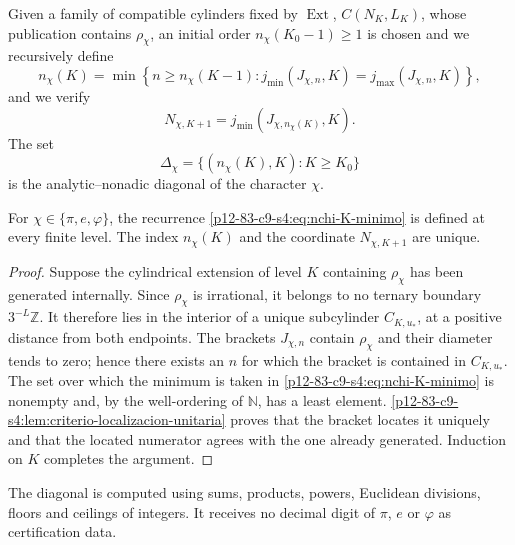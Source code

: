 \begin{definition}
\label{p12-83-c9-s4:def:recurrencia-diagonal-constantes}
Given a family of compatible cylinders fixed by \(\operatorname{Ext}\),
\(C(N_K,L_K)\), whose publication contains \(\rho_\chi\), an initial order
\(n_\chi(K_0-1)\geq1\) is chosen and we recursively define
\begin{equation}
 n_\chi(K)=
 \min\left\{
 n\geq n_\chi(K-1):
 j_{\min}(J_{\chi,n},K)=j_{\max}(J_{\chi,n},K)
 \right\},
 \label{p12-83-c9-s4:eq:nchi-K-minimo}
\end{equation}
and we verify
\begin{equation}
 N_{\chi,K+1}
 =j_{\min}(J_{\chi,n_\chi(K)},K).
 \label{p12-83-c9-s4:eq:Nchi-K-mas-uno}
\end{equation}
The set
\[
 \Delta_\chi=
 \{(n_\chi(K),K):K\geq K_0\}
\]
is the analytic--nonadic diagonal of the character \(\chi\).
\end{definition}

\begin{theorem}
\label{p12-83-c9-s4:thm:existencia-unicidad-diagonal}
For \(\chi\in\{\pi,e,\varphi\}\), the recurrence
\eqref{p12-83-c9-s4:eq:nchi-K-minimo} is defined at every finite level. The index
\(n_\chi(K)\) and the coordinate \(N_{\chi,K+1}\) are unique.
\end{theorem}

\begin{proof}
Suppose the cylindrical extension of level \(K\) containing
\(\rho_\chi\) has been generated internally. Since \(\rho_\chi\) is irrational, it belongs to no
ternary boundary \(3^{-L}\mathbb Z\). It therefore lies in the interior of a
unique subcylinder \(C_{K,u_*}\), at a positive distance from both endpoints.
The brackets \(J_{\chi,n}\) contain \(\rho_\chi\) and their diameter
tends to zero; hence there exists an \(n\) for which the bracket is
contained in \(C_{K,u_*}\). The set over which the minimum is taken in
\eqref{p12-83-c9-s4:eq:nchi-K-minimo} is nonempty and, by the well-ordering of
\(\mathbb N\), has a least element.
\cref{p12-83-c9-s4:lem:criterio-localizacion-unitaria} proves that the bracket
locates it uniquely and that the located numerator agrees with the one already
generated. Induction on \(K\) completes the argument.
\end{proof}

\begin{corollary}
The diagonal is computed using sums, products, powers, Euclidean divisions,
floors and ceilings of integers. It receives no decimal digit of \(\pi\), \(e\) or
\(\varphi\) as certification data.
\end{corollary}


